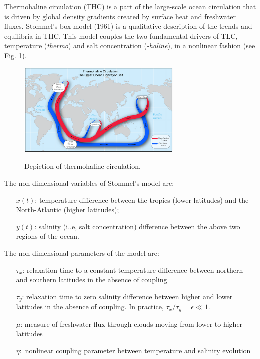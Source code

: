 \begin{exercise}
Thermohaline circulation (THC) is a part of the large-scale ocean circulation that is driven by global density gradients created by surface heat and freshwater fluxes. Stommel's box model (1961) is a qualitative description of the trends and equilibria in THC. This model couples the two fundamental drivers of TLC, temperature (\emph{thermo}) and salt concentration (\emph{-haline}), in a nonlinear fashion (see Fig. \ref{fig:ex96thermohaline}).

\begin{figure}[h]
	\centering
	\includegraphics[width=0.7\textwidth]{figures/ch9/Series/thermohaline.png}
	\label{fig:ex96thermohaline}
	\caption{Depiction of thermohaline circulation.}
\end{figure}

The non-dimensional variables of Stommel's model are:
\begin{enumerate}
\item [{$x(t)$:}] temperature difference between the tropics (lower latitudes)
and the North-Atlantic (higher latitudes);
\item [{$y(t)$:}] salinity (i..e, salt concentration) difference between
the above two regions of the ocean.
\end{enumerate}

The non-dimensional parameters of the model are:
\begin{enumerate}
\item [{$\tau_{x}$:}] relaxation time to a constant temperature difference
between northern and southern latitudes in the absence of coupling
\item [{$\tau_{y}$:}] relaxation time to zero salinity difference between
higher and lower latitudes in the absence of coupling. In practice,
$\tau_{x}/\tau_{y}=\epsilon\ll1.$
\item [{$\mu$:}] measure of freshwater flux through clouds moving from
lower to higher latitudes
\item [{$\eta:$}] nonlinear coupling parameter between temperature and
salinity evolution
\end{enumerate}


\end{exercise}
